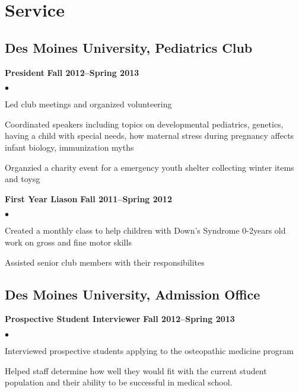 \documentclass[10pt,letterpaper]{article}
\renewenvironment{itemize}{
  \begin{list}{}{
      \setlength{\leftmargin}{1.5em}
      \setlength{\itemsep}{0.25em}
      \setlength{\parskip}{0pt}
      \setlength{\parsep}{0.25em}
    }
  }{
  \end{list}
}
\newenvironment{bitemize}{
  \begin{list}{$\bullet$}{
      \setlength{\leftmargin}{1.5em}
      \setlength{\itemsep}{0.25em}
      \setlength{\parskip}{0pt}
      \setlength{\parsep}{0.25em}
    }
  }{
  \end{list}
}
\newcommand{\yearrange}[1]{\hfill \textbf{#1} \par}
\begin{document}
\section*{Service}
\subsection*{Des Moines University, Pediatrics Club}
\begin{itemize}
\item \textbf{President} \yearrange{Fall 2012--Spring 2013}
  \begin{bitemize}
  \item Led club meetings and organized volunteering
  \item Coordinated speakers including topics on developmental
    pediatrics, genetics, having a child with special needs, how
    maternal stress during pregnancy affects infant biology,
    immunization myths
  \item Organzied a charity event for a emergency youth shelter
    collecting winter items and toysg
  \end{bitemize}
\item \textbf{First Year Liason} \yearrange{Fall 2011--Spring 2012}
  \begin{bitemize}
  \item Created a monthly class to help children with Down's Syndrome 
    0-2years old work on gross and fine motor skills
  \item Assisted senior club members with their responsibilites
  \end{bitemize}
\end{itemize}

\subsection*{Des Moines University, Admission Office}
\begin{itemize}
\item \textbf{Prospective Student Interviewer} \yearrange{Fall 2012--Spring 2013}
  \begin{bitemize}
  \item Interviewed prospective students applying to the osteopathic
    medicine program 
   \item Helped staff determine how well they would fit
    with the current student population and their ability to be
    successful in medical school.
  \end{bitemize}
\end{itemize}
\end{document}
